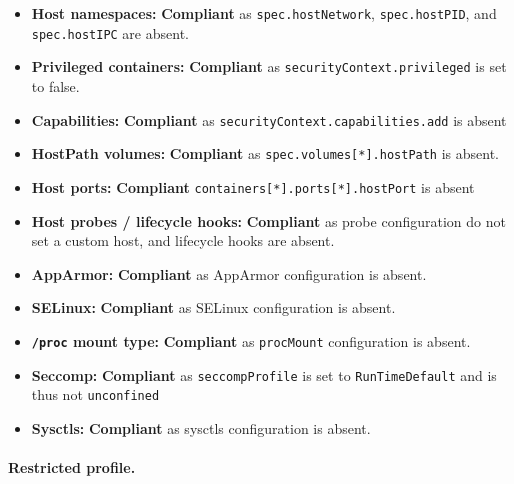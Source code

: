 \documentclass[11pt,a4paper]{article}
\begin{document}
	\begin{itemize}
		\item \textbf{Host namespaces:} \textbf{Compliant} as \texttt{spec.hostNetwork}, \texttt{spec.hostPID}, and \texttt{spec.hostIPC} are absent.
		
		\item \textbf{Privileged containers:} \textbf{Compliant} as \texttt{securityContext.privileged} is set to false.
		
		\item \textbf{Capabilities:} \textbf{Compliant} as \texttt{securityContext.capabilities.add} is absent
		
		\item \textbf{HostPath volumes:} \textbf{Compliant} as \texttt{spec.volumes[*].hostPath} is absent.
		
		\item \textbf{Host ports:} \textbf{Compliant} \texttt{containers[*].ports[*].hostPort} is absent
		
		\item \textbf{Host probes / lifecycle hooks:} \textbf{Compliant} as probe configuration do not set a custom host, and lifecycle hooks are absent.
		
		\item \textbf{AppArmor:} \textbf{Compliant} as AppArmor configuration is absent.
		
		\item \textbf{SELinux:} \textbf{Compliant} as SELinux configuration is absent.
		
		\item \textbf{\texttt{/proc} mount type:} \textbf{Compliant} as \texttt{procMount} configuration is absent.
		
		\item \textbf{Seccomp:} \textbf{Compliant} as \texttt{seccompProfile} is set to \texttt{RunTimeDefault} and is thus not \texttt{unconfined}
			
		\item \textbf{Sysctls:} \textbf{Compliant} as sysctls configuration is absent. 
	\end{itemize}
	
	\paragraph{Restricted profile.}
	
\end{document}
